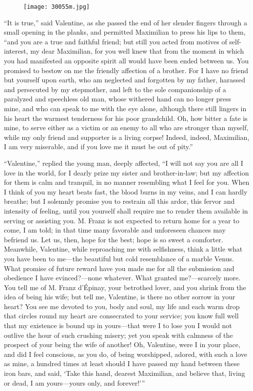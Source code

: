 \begin{figure}[ht]
\texttt{[image: 30055m.jpg]}
\end{figure}

“It is true,” said Valentine, as she passed the end of her slender
fingers through a small opening in the planks, and permitted Maximilian
to press his lips to them, “and you are a true and faithful friend; but
still you acted from motives of self-interest, my dear Maximilian, for
you well knew that from the moment in which you had manifested an
opposite spirit all would have been ended between us. You promised to
bestow on me the friendly affection of a brother. For I have no friend
but yourself upon earth, who am neglected and forgotten by my father,
harassed and persecuted by my stepmother, and left to the sole
companionship of a paralyzed and speechless old man, whose withered
hand can no longer press mine, and who can speak to me with the eye
alone, although there still lingers in his heart the warmest tenderness
for his poor grandchild. Oh, how bitter a fate is mine, to serve either
as a victim or an enemy to all who are stronger than myself, while my
only friend and supporter is a living corpse! Indeed, indeed,
Maximilian, I am very miserable, and if you love me it must be out of
pity.”

“Valentine,” replied the young man, deeply affected, “I will not say
you are all I love in the world, for I dearly prize my sister and
brother-in-law; but my affection for them is calm and tranquil, in no
manner resembling what I feel for you. When I think of you my heart
beats fast, the blood burns in my veins, and I can hardly breathe; but
I solemnly promise you to restrain all this ardor, this fervor and
intensity of feeling, until you yourself shall require me to render
them available in serving or assisting you. M. Franz is not expected to
return home for a year to come, I am told; in that time many favorable
and unforeseen chances may befriend us. Let us, then, hope for the
best; hope is so sweet a comforter. Meanwhile, Valentine, while
reproaching me with selfishness, think a little what you have been to
me—the beautiful but cold resemblance of a marble Venus. What promise
of future reward have you made me for all the submission and obedience
I have evinced?—none whatever. What granted me?—scarcely more. You tell
me of M. Franz d’Épinay, your betrothed lover, and you shrink from the
idea of being his wife; but tell me, Valentine, is there no other
sorrow in your heart? You see me devoted to you, body and soul, my life
and each warm drop that circles round my heart are consecrated to your
service; you know full well that my existence is bound up in yours—that
were I to lose you I would not outlive the hour of such crushing
misery; yet you speak with calmness of the prospect of your being the
wife of another! Oh, Valentine, were I in your place, and did I feel
conscious, as you do, of being worshipped, adored, with such a love as
mine, a hundred times at least should I have passed my hand between
these iron bars, and said, ‘Take this hand, dearest Maximilian, and
believe that, living or dead, I am yours—yours only, and forever!’”

